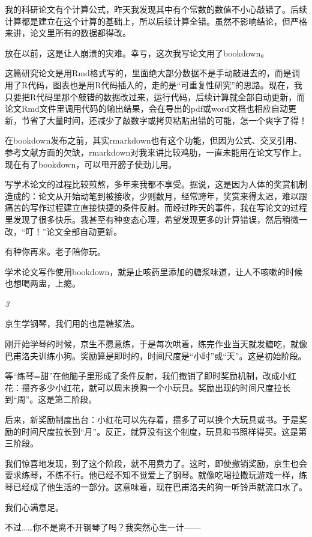 \documentclass[twoside,openright,headings=optiontohead]{ctexbook} %
\begin{document}
{我的科研论文有个计算公式，昨天我发现其中有个常数的数值不小心敲错了。后续计算都是建立在这个计算的基础上，所以后续计算全错。虽然不影响结论，但严格来讲，论文里所有的数据都得改。

放在以前，这是让人崩溃的灾难。幸亏，这次我写论文用了bookdown。

这篇研究论文是用Rmd格式写的，里面绝大部分数据不是手动敲进去的，而是调用了R代码，图表也是用R代码插入的，走的是``可重复性研究''的思路。现在，我只要把R代码里那个敲错的数据改过来，运行代码，后续计算就全部自动更新，而论文Rmd文件里调用代码的输出结果，会在导出的pdf或word文档也相应自动更新，节省了大量时间，还减少了敲数字或拷贝粘贴出错的可能，怎一个爽字了得！

在bookdown发布之前，其实rmarkdown也有这个功能，但因为公式、交叉引用、参考文献方面的欠缺，rmarkdown对我来讲比较鸡肋，一直未能用在论文写作上。现在有了bookdown，可以甩开膀子使劲儿用。

写学术论文的过程比较煎熬，多年来我都不享受。据说，这是因为人体的奖赏机制造成的：论文从开始动笔到被接收，少则数月，经常跨年，奖赏来得太迟，难以跟痛苦的写作过程建立直接快捷的条件反射。而经过昨天的事件，我在写论文的过程里发现了很多快乐。我甚至有种变态心理，希望发现更多的计算错误，然后稍微一改，``叮！''论文全部自动更新。

有种你再来。老子陪你玩。

学术论文写作使用bookdown，就是止咳药里添加的糖浆味道，让人不咳嗽的时候也想喝两盅，上瘾。

\emph{3}

京生学钢琴，我们用的也是糖浆法。

刚开始学琴的时候，京生不愿意练，于是每次哄着，练完作业当天就发糖吃，就像巴甫洛夫训练小狗。奖励算是即时的，时间尺度是``小时''或``天''。这是初始阶段。

等``练琴=甜''在他脑子里形成了条件反射，我们撤销了即时奖励机制，改成小红花：攒齐多少小红花，就可以周末换购一个小玩具。奖励出现的时间尺度拉长到``周''。这是第二阶段。

后来，新奖励制度出台：小红花可以先存着，攒多了可以换个大玩具或书。于是奖励的时间尺度拉长到``月''。反正，就算没有这个制度，玩具和书照样得买。这是第三阶段。

我们惊喜地发现，到了这个阶段，就不用费力了。这时，即使撤销奖励，京生也会要求练琴，不练不行。他已经不知不觉爱上了钢琴。就像吃喝拉撒玩游戏一样，练琴已经成了他生活的一部分。这意味着，现在巴甫洛夫的狗一听铃声就流口水了。

我们心满意足。

不过\ldots{}\ldots{}你不是离不开钢琴了吗？我突然心生一计------

}
\end{document}
